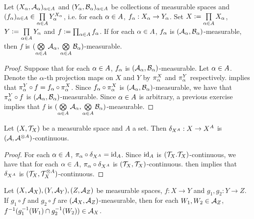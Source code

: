\documentclass{book}
\begin{document}
	\begin{ex} 
		Let $(X_{\alpha}, \mathcal{A}_{\alpha})_{\alpha \in A}$ and $(Y_{\alpha}, \mathcal{B}_{\alpha})_{\alpha \in A}$ be collections of measurable spaces and $(f_{\alpha})_{\alpha \in A} \in \prod\limits_{\alpha \in A} Y_{\alpha}^{X_{\alpha}}$, i.e. for each $\alpha \in A$, $f_{\alpha}:X_{\alpha} \rightarrow Y_{\alpha}$. Set $X \vcentcolon= \prod\limits_{\alpha \in A} X_{\alpha}$, $Y \vcentcolon= \prod\limits_{\alpha \in A}Y_{\alpha}$ and $f \vcentcolon= \prod_{\alpha \in A} f_{\alpha}$. If for each $\alpha \in A$, $f_{\alpha}$ is $(\mathcal{A}_{\alpha}, \mathcal{B}_{\alpha})$-measurable, then $f$ is $(\bigotimes\limits_{\alpha \in A} \mathcal{A}_{\alpha}, \bigotimes\limits_{\alpha \in A} \mathcal{B}_{\alpha})$-measurable.
	\end{ex}
	
	\begin{proof} 
		Suppose that for each $\alpha \in A$, $f_{\alpha}$ is $(\mathcal{A}_{\alpha}, \mathcal{B}_{\alpha})$-measurable. Let $\alpha \in A$. Denote the $\alpha$-th projection maps on $X$ and $Y$ by $\pi^X_{\alpha}$ and $\pi^Y_{\alpha}$ respectively.   implies that $\pi^Y_{\alpha} \circ f = f_{\alpha} \circ \pi^X_{\alpha}$. Since $f_{\alpha} \circ \pi^X_{\alpha}$ is $(\mathcal{A}_{\alpha}, \mathcal{B}_{\alpha})$-measurable, we have that $\pi^Y_{\alpha} \circ f$ is $(\mathcal{A}_{\alpha}, \mathcal{B}_{\alpha})$-measurable. Since $\alpha \in A$ is arbitrary, a previous exercise implies that $f$ is $(\bigotimes\limits_{\alpha \in A} \mathcal{A}_{\alpha}, \bigotimes\limits_{\alpha \in A} \mathcal{B}_{\alpha})$-measurable.
	\end{proof}
	
	\begin{ex} 
		Let $(X, \mathcal{T}_X)$ be a measurable space and $A$ a set. Then $\delta_{X^A}:X \rightarrow X^A$ is $(\mathcal{A}, \mathcal{A}^{\otimes A})$-continuous.
		
	\end{ex}
	
	\begin{proof}
		For each $\alpha \in A$, $\pi_{\alpha} \circ \delta_{X^A} = \operatorname{id}_A$. Since $\operatorname{id}_A$ is $(\mathcal{T}_X. \mathcal{T}_X)$-continuous, we have that for each $\alpha \in A$, $\pi_{\alpha} \circ \delta_{X^A}$ is $(\mathcal{T}_X, \mathcal{T}_X)$-continuous.  then implies that $\delta_{X^A}$ is $(\mathcal{T}_X, \mathcal{T}_X^{\otimes A})$-continuous. 
	\end{proof}
	
	\begin{ex} 
		Let $(X, \mathcal{A}_X), (Y, \mathcal{A}_Y), (Z, \mathcal{A}_Z)$ be measurable spaces, $f:X \rightarrow Y$ and $g_1, g_2:Y \rightarrow Z$. If $g_1 \circ f$ and $g_2 \circ f$ are $(\mathcal{A}_X, \mathcal{A}_Z)$-measurable, then for each $W_1, W_2 \in \mathcal{A}_Z$, $f^{-1}(g_1^{-1}(W_1) \cap g_2^{-1}(W_2)) \in \mathcal{A}_X$.
	\end{ex}
	
\end{document}
